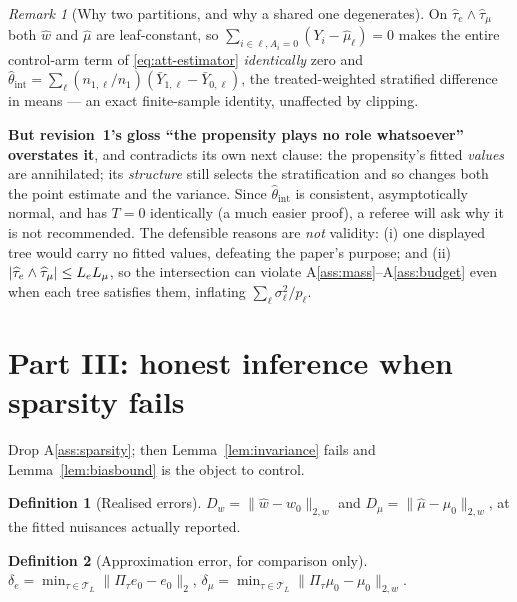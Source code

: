 \documentclass[11pt]{article}
\theoremstyle{plain}
\theoremstyle{definition}
\newtheorem{definition}{Definition}
\theoremstyle{remark}
\newtheorem{remark}{Remark}
\newcommand{\cT}{\mathcal{T}}
\newcommand{\ez}{e_0}
\newcommand{\mz}{\mu_0}
\newcommand{\wz}{w_0}
\newcommand{\mhat}{\widehat{\mu}}
\newcommand{\what}{\widehat{w}}
\newcommand{\that}{\widehat{\tau}}
\newcommand{\thetahat}{\widehat{\theta}}
\newcommand{\Dw}{D_w}
\newcommand{\Dm}{D_\mu}
\newcommand{\Ltwo}[1]{\lVert #1 \rVert_{2}}
\newcommand{\Lw}[1]{\lVert #1 \rVert_{2,w}}
\DeclarePairedDelimiter{\card}{\lvert}{\rvert}
\begin{document}
\begin{remark}[Why two partitions, and why a shared one degenerates]
\label{rem:shared}
On $\that_e\wedge\that_\mu$ both $\what$ and $\mhat$ are leaf-constant, so
$\sum_{i\in\ell,A_i=0}(Y_i-\mhat_\ell)=0$ makes the entire control-arm term of
\eqref{eq:att-estimator} \emph{identically} zero and
$\thetahat_{\mathrm{int}}=\sum_\ell(n_{1,\ell}/n_1)(\bar Y_{1,\ell}-\bar
Y_{0,\ell})$, the treated-weighted stratified difference in means --- an exact
finite-sample identity, unaffected by clipping.

\textbf{But revision~1's gloss ``the propensity plays no role whatsoever''
overstates it}, and contradicts its own next clause: the propensity's fitted
\emph{values} are annihilated; its \emph{structure} still selects the
stratification and so changes both the point estimate and the variance. Since
$\thetahat_{\mathrm{int}}$ is consistent, asymptotically normal, and has $T=0$
identically (a much easier proof), a referee will ask why it is not recommended.
The defensible reasons are \emph{not} validity: (i) one displayed tree would carry
no fitted values, defeating the paper's purpose; and (ii)
$\card{\that_e\wedge\that_\mu}\le L_eL_\mu$, so the intersection can violate
A\ref{ass:mass}--A\ref{ass:budget} even when each tree satisfies them, inflating
$\sum_\ell\sigma^2_\ell/p_\ell$.
\end{remark}

\section{Part III: honest inference when sparsity fails}

Drop A\ref{ass:sparsity}; then Lemma~\ref{lem:invariance} fails and
Lemma~\ref{lem:biasbound} is the object to control.

\begin{definition}[Realised errors]\label{def:realised}
$\Dw=\Lw{\what-\wz}$ and $\Dm=\Lw{\mhat-\mz}$, at the fitted nuisances actually
reported.
\end{definition}

\begin{definition}[Approximation error, for comparison only]\label{def:delta}
$\delta_e=\min_{\tau\in\cT_{\bar L}}\Ltwo{\Pi_\tau\ez-\ez}$,
$\delta_\mu=\min_{\tau\in\cT_{\bar L}}\Lw{\Pi_\tau\mz-\mz}$.
\end{definition}
\end{document}
